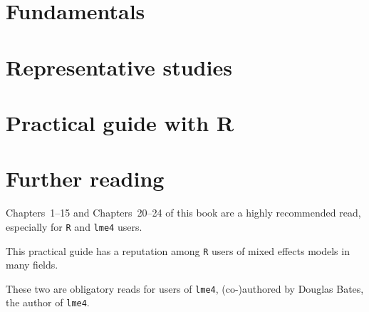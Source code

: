 \documentclass[graybox]{svmult}
\begin{document}
\section{Fundamentals}
\label{sec:fundamentals}




\newpage
\section*{Representative studies}



\newpage
\section{Practical guide with R}
\label{sec:practicalguidewithr}



\section*{Further reading}
\label{sec:furtherreading}

  \begin{refsection}
  \nocite{GelmanHill2007}
  \toggletrue{bbx:boldentries}
  \printbibliography[heading=none]
  \end{refsection}

Chapters~1--15 and Chapters~20--24 of this book are a highly recommended read, especially for \texttt{R} and \texttt{lme4} users.

  \begin{refsection}
  \nocite{ZuurEa2009}
  \toggletrue{bbx:boldentries}
  \printbibliography[heading=none]
  \end{refsection}

This practical guide has a reputation among \texttt{R} users of mixed effects models in many fields.

  \begin{refsection}
  \nocite{Bates2010,BatesEa2015}
  \toggletrue{bbx:boldentries}
  \printbibliography[heading=none]
  \end{refsection}

  These two are obligatory reads for users of \texttt{lme4}, (co-)authored by Douglas Bates, the author of \texttt{lme4}.

\printbibliography
%
\end{document}
